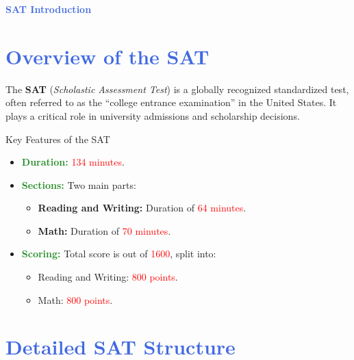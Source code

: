 \documentclass{article}
\begin{document}
\begin{center}
    {\Huge \textcolor{RoyalBlue}{\textbf{SAT Introduction}}}
\end{center}

\vspace{1cm}

\section*{\textcolor{RoyalBlue}{Overview of the SAT}}
The \textbf{SAT} (\textit{Scholastic Assessment Test}) is a globally recognized standardized test, often referred to as the ``college entrance examination'' in the United States. It plays a critical role in university admissions and scholarship decisions.

\vspace{0.5cm}

\begin{definitionbox}{Key Features of the SAT}
\begin{itemize}
    \item \textcolor{ForestGreen}{\textbf{Duration:}} \textcolor{Red}{134 minutes}.
    \item \textcolor{ForestGreen}{\textbf{Sections:}} Two main parts:
    \begin{itemize}
        \item \textbf{Reading and Writing:} Duration of \textcolor{Red}{64 minutes}.
        \item \textbf{Math:} Duration of \textcolor{Red}{70 minutes}.
    \end{itemize}
    \item \textcolor{ForestGreen}{\textbf{Scoring:}} Total score is out of \textcolor{Red}{1600}, split into:
    \begin{itemize}
        \item Reading and Writing: \textcolor{Red}{800 points}.
        \item Math: \textcolor{Red}{800 points}.
    \end{itemize}
\end{itemize}
\end{definitionbox}

\vspace{0.5cm}

\section*{\textcolor{RoyalBlue}{Detailed SAT Structure}}
\end{document}
